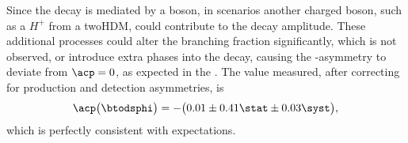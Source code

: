 Since the decay \btodsphi is mediated by a \Wp boson, in \np scenarios another charged boson, such
as a $H^+$ from a \gls{twoHDM}, could contribute to the decay amplitude.
These additional processes could alter the branching fraction significantly, which is not observed,
or introduce extra phases into the decay, causing the \CP-asymmetry to deviate from $\acp=0$, as
expected in the \sm.
The value measured, after correcting for production and detection asymmetries, is
\begin{equation*}
  \acp\big(\btodsphi\big)=
  -\big(0.01\pm0.41\stat\pm0.03\syst\big),
\end{equation*}
which is perfectly consistent with \sm expectations.





